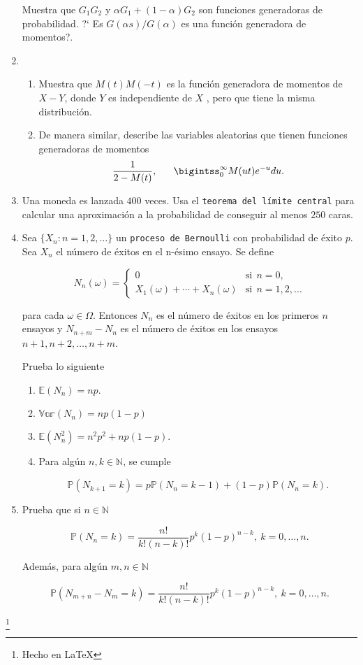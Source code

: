 \documentclass[a4paper,11pt]{report}
\begin{document}
\begin{enumerate}
Muestra  que $G_1G_2$ y $\alpha G_1 + (1 -\alpha)G_2$ son funciones generadoras de probabilidad. ?` Es $G(\alpha s)/G(\alpha)$ es una funci\'on generadora de momentos?.
\item 
\begin{enumerate}
\item Muestra que $M(t)M(-t)$ es la funci\'on generadora de momentos de $X -Y$, donde $Y$ es independiente de $X$ , pero que tiene la misma distribuci\'on.
\item De manera similar, describe las variables aleatorias que tienen funciones generadoras de momentos
\[
\dfrac{1}{2 -M(t)}, \ \ \ \ \ \bigintss_{0}^{\infty}M(ut)e^{-u}du.
\]
\end{enumerate}
\item Una moneda es lanzada $400$ veces. Usa el \texttt{teorema del l\'imite central} para calcular una aproximaci\'on a la probabilidad de conseguir al menos $250$ caras.
\item Sea $\{X_n: n = 1,2, \dots\}$ un \texttt{proceso de Bernoulli} con probabilidad de \'exito $p$. Sea $X_n$ el n\'umero de \'exitos en el n-\'esimo ensayo. Se define

\[
N_{n}(\omega) = \begin{cases}
0 & \text{si} \ \ n = 0, \\
X_{1}(\omega)+ \cdots +X_{n}(\omega)& \text{si} \ \ n =1, 2, \dots 
\end{cases}
\]

para cada $\omega \in \Omega$. Entonces $N_n$ es el n\'umero de \'exitos en los primeros $n$ ensayos y $N_{n + m} - N_{n}$ es el n\'umero de \'exitos en los ensayos $n +1, n + 2, \dots, n + m$.

\vspace{0.2cm}

Prueba lo siguiente

\vspace{0.2cm}

\begin{enumerate}
	\item $\mathbb{E}(N_n) = np$.
\item $\mathbb{Var}(N_n) = np(1 -p)$
\item  $\mathbb{E}(N_n^2) = n^2p^2 + np(1 -p)$.
\item Para alg\'un $n , k \in \mathbb{N}$, se cumple

\[
\mathbb{P}(N_{k + 1} = k) = p\mathbb{P}(N_{n} = k -1) + (1- p)\mathbb{P}(N_n = k).
\]
\end{enumerate}
\item Prueba que si $n \in \mathbb{N}$

\[
\mathbb{P}(N_n = k) = \frac{n!}{k!(n -k)!}p^k(1 -p)^{n -k}, \ k =0,\dots, n.
\]

\vspace{0.2cm}

Adem\'as, para alg\'un $m, n \in \mathbb{N}$

\[
\mathbb{P}(N_{m + n} - N_{m}= k) = \frac{n!}{k!(n -k)!}p^k(1 -p)^{n -k}, \ k =0,\dots, n.
\]
\end{enumerate}

\begin{flushright}
\footnote{Hecho en \LaTeX}
\end{flushright}
\end{document}
